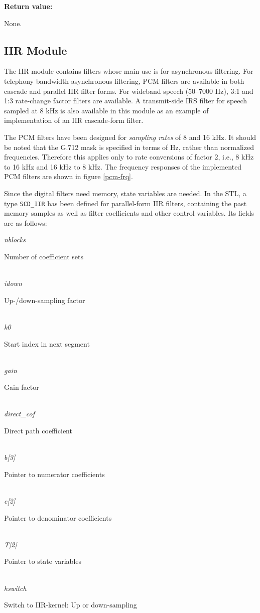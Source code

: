 {\bf Return value: }

None.


\subsection{IIR Module}

The IIR module contains filters whose main use is for asynchronous
filtering. For telephony bandwidth asynchronous filtering, PCM filters
are available in both cascade and parallel IIR filter forms. For
wideband speech (50--7000 Hz), 3:1 and 1:3 rate-change factor filters
are available. A transmit-side IRS filter for speech sampled at 8 kHz
is also available in this module as an example of implementation of an
IIR cascade-form filter.

The PCM filters have been designed for {\em sampling rates} of 8 and 16
kHz. It should be noted that the G.712 mask is specified in terms of Hz,
rather than normalized frequencies. Therefore this applies only to rate
conversions of factor 2, i.e., 8 kHz to 16 kHz and 16 kHz to 8 kHz.
The frequency responses of the implemented PCM filters are shown in
figure \ref{pcm-frq}.

Since the digital filters need memory, state variables are needed. In
the STL, a type {\tt SCD\_IIR} has been defined for parallel-form IIR
filters, containing the past memory samples as well as filter
coefficients and other control variables. Its fields are as follows:

 \begin{minipage}{130mm} \normalsize
 {\em nblocks}  \dotfill \parbox{100mm}{\SF Number of coefficient sets}\\
 {\em idown}    \dotfill \parbox{100mm}{\SF Up-/down-sampling factor}\\
 {\em k0}       \dotfill \parbox{100mm}{\SF Start index in next segment}\\
 {\em gain}     \dotfill \parbox{100mm}{\SF Gain factor}\\
 {\em direct\_cof} \dotfill \parbox{100mm}{\SF Direct path coefficient}\\
 {\em b[3]}     \dotfill \parbox{100mm}{\SF Pointer to numerator coefficients}\\
 {\em c[2]}     \dotfill \parbox{100mm}{\SF Pointer to denominator coefficients}\\
 {\em T[2]}     \dotfill \parbox{100mm}{\SF Pointer to state variables}\\
 {\em hswitch}  \dotfill \parbox{100mm}{\SF Switch to IIR-kernel: Up or
                                          down-sampling}\\
\end{minipage}

